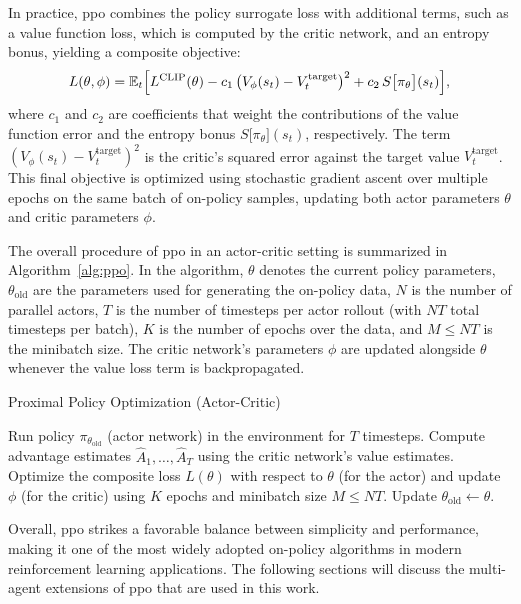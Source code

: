 In practice, \gls{ppo} combines the policy surrogate loss with additional terms, such as a value function loss, which is computed by the critic network, and an entropy bonus, yielding a composite objective:
\[
L(\theta,\phi) = \mathbb{E}_t\Bigl[L^{\text{CLIP}}(\theta)
  - c_1\,\bigl(V_\phi(s_t) - V_t^{\text{target}}\bigr)^2
  + c_2\,S\bigl[\pi_\theta\big](s_t)\Bigr],
\]
where \(c_1\) and \(c_2\) are coefficients that weight the contributions of the value function error and the entropy bonus \(S\big[\pi_\theta\big](s_t)\), respectively. The term \(\left(V_\phi(s_t) - V_t^{\text{target}}\right)^2\) is the critic's squared error against the target value \(V_t^{\text{target}}\). This final objective is optimized using stochastic gradient ascent over multiple epochs on the same batch of on-policy samples, updating both actor parameters \(\theta\) and critic parameters \(\phi\).

The overall procedure of \gls{ppo} in an actor-critic setting is summarized in Algorithm~\ref{alg:ppo}. In the algorithm, \(\theta\) denotes the current policy parameters, \(\theta_{\text{old}}\) are the parameters used for generating the on-policy data, \(N\) is the number of parallel actors, \(T\) is the number of timesteps per actor rollout (with \(NT\) total timesteps per batch), \(K\) is the number of epochs over the data, and \(M \le NT\) is the minibatch size. The critic network's parameters \(\phi\) are updated alongside \(\theta\) whenever the value loss term is backpropagated.

\begin{algorithm}[H]
\caption{Proximal Policy Optimization (Actor-Critic)}
\label{alg:ppo}
\begin{algorithmic}[1]
        \State Run policy \(\pi_{\theta_{\text{old}}}\) (actor network) in the environment for \(T\) timesteps.
        \State Compute advantage estimates \(\hat{A}_1, \dots, \hat{A}_T\) using the critic network's value estimates.
    \EndFor
    \State Optimize the composite loss \(L(\theta)\) with respect to \(\theta\) (for the actor) and update \(\phi\) (for the critic) using \(K\) epochs and minibatch size \(M \le NT\).
    \State Update \(\theta_{\text{old}} \leftarrow \theta\).
\EndFor
\end{algorithmic}
\end{algorithm}

Overall, \gls{ppo} strikes a favorable balance between simplicity and performance, making it one of the most widely adopted on-policy algorithms in modern reinforcement learning applications. The following sections will discuss the multi-agent extensions of \gls{ppo} that are used in this work.
